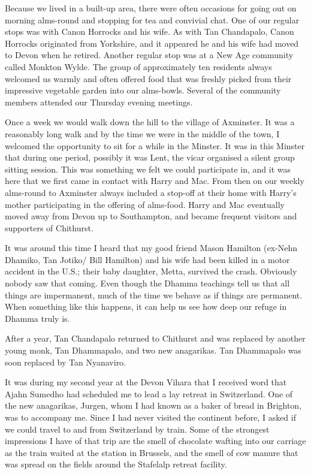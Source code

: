 Because we lived in a built-up area, there were often occasions for
going out on morning alms-round and stopping for tea and convivial chat.
One of our regular stops was with Canon Horrocks and his wife. As with
Tan Chandapalo, Canon Horrocks originated from Yorkshire, and it
appeared he and his wife had moved to Devon when he retired. Another
regular stop was at a New Age community called Monkton Wylde. The group
of approximately ten residents always welcomed us warmly and often
offered food that was freshly picked from their impressive vegetable
garden into our alms-bowls. Several of the community members attended
our Thursday evening meetings.

Once a week we would walk down the hill to the village of Axminster. It
was a reasonably long walk and by the time we were in the middle of the
town, I welcomed the opportunity to sit for a while in the Minster. It
was in this Minster that during one period, possibly it was Lent, the
vicar organised a silent group sitting session. This was something we
felt we could participate in, and it was here that we first came in
contact with Harry and Mac. From then on our weekly alms-round to
Axminster always included a stop-off at their home with Harry's mother
participating in the offering of alms-food. Harry and Mac eventually
moved away from Devon up to Southampton, and became frequent visitors
and supporters of Chithurst.

It was around this time I heard that my good friend Mason Hamilton
(ex-Nehn Dhamiko, Tan Jotiko/ Bill Hamilton) and his wife had been
killed in a motor accident in the U.S.; their baby daughter, Metta,
survived the crash. Obviously nobody saw that coming. Even though the
Dhamma teachings tell us that all things are impermanent, much of the
time we behave as if things are permanent. When something like this
happens, it can help us see how deep our refuge in Dhamma truly is.

After a year, Tan Chandapalo returned to Chithurst and was replaced by
another young monk, Tan Dhammapalo, and two new anagarikas. Tan
Dhammapalo was soon replaced by Tan Nyanaviro.

It was during my second year at the Devon Vihara that I received word
that Ajahn Sumedho had scheduled me to lead a lay retreat in
Switzerland. One of the new anagarikas, Jurgen, whom I had known as a
baker of bread in Brighton, was to accompany me. Since I had never
visited the continent before, I asked if we could travel to and from
Switzerland by train. Some of the strongest impressions I have of that
trip are the smell of chocolate wafting into our carriage as the train
waited at the station in Brussels, and the smell of cow manure that was
spread on the fields around the Stafelalp retreat facility.


